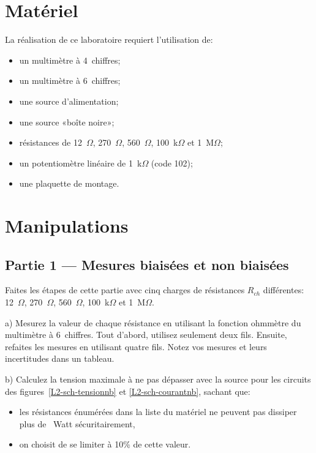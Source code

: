 \documentclass[canadien,12pt,oneside,letterpaper]{article}
\begin{document}
\section{Matériel}

\noindent La réalisation de ce laboratoire requiert l'utilisation de:
\vspace{1ex}
\begin{itemize} \itemsep4pt
\item un multimètre à 4\textonehalf~chiffres;
\item un multimètre à 6\textonehalf~chiffres;
\item une source d'alimentation;
\item une source «boîte noire»;
\item résistances de 12~$\Omega$, 270~$\Omega$, 560~$\Omega$, 100~k$\Omega$ et 1~M$\Omega$;
\item un potentiomètre linéaire de 1~k$\Omega$ (code 102);
\item une plaquette de montage.
\end{itemize}


\section{Manipulations}

\setlength{\parskip}{1ex plus 0.5ex minus 0.2ex}

\subsection{Partie 1 --- Mesures biaisées et non biaisées} \label{sec:part1}

Faites les étapes de cette partie avec cinq charges de résistances $R_{ch}$ différentes: 12~$\Omega$, 270~$\Omega$, 560~$\Omega$, 100~k$\Omega$ et 1~M$\Omega$.

a) Mesurez la valeur de chaque résistance en utilisant la fonction ohmmètre du multimètre à 6\textonehalf~chiffres. Tout d'abord, utilisez seulement deux fils. Ensuite, refaites les mesures en utilisant quatre fils. Notez vos mesures et leurs incertitudes dans un tableau.

b) Calculez la tension maximale à ne pas dépasser avec la source pour les circuits des figures~\ref{L2-sch-tensionnb} et \ref{L2-sch-courantnb}, sachant que: 
    \begin{itemize}
    \item les résistances énumérées dans la liste du matériel ne peuvent pas dissiper plus de \textonequarter~Watt sécuritairement,  
    \item on choisit de se limiter à 10\% de cette valeur.
    \end{itemize}
\vspace{1ex}
\end{document}
